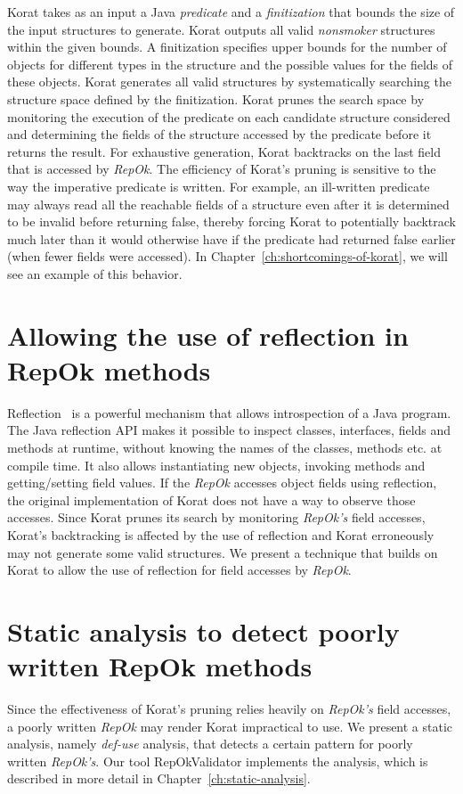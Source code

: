 \para Korat takes as an input a Java \emph{predicate} and a
\emph{finitization} that bounds the size of the input structures to
generate.  Korat outputs all valid \emph{nonsmoker} structures
within the given bounds. A finitization specifies upper bounds for the
number of objects for different types in the structure and the
possible values for the fields of these objects. Korat generates all
valid structures by systematically searching the structure space
defined by the finitization. Korat prunes the search space by
monitoring the execution of the predicate on each candidate structure
considered and determining the fields of the structure accessed by the
predicate before it returns the result. For exhaustive generation,
Korat backtracks on the last field that is accessed by \emph{RepOk}.  The
efficiency of Korat's pruning is sensitive to the way the imperative
predicate is written. For example, an ill-written predicate may always
read all the reachable fields of a structure even after it is
determined to be invalid before returning false, thereby forcing Korat
to potentially backtrack much later than it would otherwise have if
the predicate had returned false earlier (when fewer fields were
accessed).  In Chapter~\ref{ch:shortcomings-of-korat}, we will see an
example of this behavior.

\section{Allowing the use of reflection in RepOk methods}
\label{sec:allowing-reflection-repok}
Reflection~\cite{maes1987concepts,bracha2004mirrors,mostinckx2009mirror} is a powerful mechanism that allows
introspection of a Java program.  The Java reflection API makes it
possible to inspect classes, interfaces, fields and methods at
runtime, without knowing the names of the classes, methods etc. at
compile time. It also allows instantiating new objects, invoking
methods and getting/setting field values.  If the \emph{RepOk} accesses
object fields using reflection, the original implementation of Korat
does not have a way to observe those accesses.  Since Korat prunes its
search by monitoring \emph{RepOk's} field accesses, Korat's backtracking is
affected by the use of reflection and Korat erroneously may not
generate some valid structures.  We present a technique that builds on
Korat to allow the use of reflection for field accesses by \emph{RepOk}.

\section{Static analysis to detect poorly written RepOk methods}
\label{sec:static-analysis-poorly-written-repok}
Since the effectiveness of Korat's pruning relies heavily on \emph{RepOk's}
field accesses, a poorly written \emph{RepOk} may render Korat impractical to
use.  We present a static analysis, namely \emph{def-use} analysis,
that detects a certain pattern for poorly written \emph{RepOk's}.  Our tool
RepOkValidator implements the analysis, which is described in more
detail in Chapter~\ref{ch:static-analysis}.

